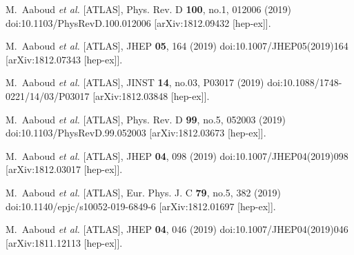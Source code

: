 \begin{thebibliography}{9}
M.~Aaboud \textit{et al.} [ATLAS],
Phys. Rev. D \textbf{100}, no.1, 012006 (2019)
doi:10.1103/PhysRevD.100.012006
[arXiv:1812.09432 [hep-ex]].

M.~Aaboud \textit{et al.} [ATLAS],
JHEP \textbf{05}, 164 (2019)
doi:10.1007/JHEP05(2019)164
[arXiv:1812.07343 [hep-ex]].

M.~Aaboud \textit{et al.} [ATLAS],
JINST \textbf{14}, no.03, P03017 (2019)
doi:10.1088/1748-0221/14/03/P03017
[arXiv:1812.03848 [hep-ex]].

M.~Aaboud \textit{et al.} [ATLAS],
Phys. Rev. D \textbf{99}, no.5, 052003 (2019)
doi:10.1103/PhysRevD.99.052003
[arXiv:1812.03673 [hep-ex]].

M.~Aaboud \textit{et al.} [ATLAS],
JHEP \textbf{04}, 098 (2019)
doi:10.1007/JHEP04(2019)098
[arXiv:1812.03017 [hep-ex]].

M.~Aaboud \textit{et al.} [ATLAS],
Eur. Phys. J. C \textbf{79}, no.5, 382 (2019)
doi:10.1140/epjc/s10052-019-6849-6
[arXiv:1812.01697 [hep-ex]].

M.~Aaboud \textit{et al.} [ATLAS],
JHEP \textbf{04}, 046 (2019)
doi:10.1007/JHEP04(2019)046
[arXiv:1811.12113 [hep-ex]].


\end{thebibliography}
